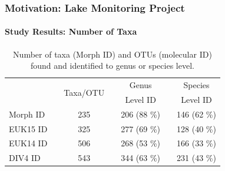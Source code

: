 \documentclass[xcolor=dvipsnames,envcountsect]{beamer}
\begin{document}
\begin{frame}\frametitle{Motivation: Lake Monitoring Project}
\framesubtitle{Study Results: Number of Taxa}

\begin{table}[htpb]\centering
\begin{tabular}{lcccccc}\toprule
&& \multirow{2}{*}{Taxa/OTU} && Genus && Species\\
&& && Level ID && Level ID \\\toprule
Morph ID && 235 && 206 (88 \%)&& 146 (62 \%) \\
EUK15 ID && 325 && 277 (69 \%) && 128 (40 \%) \\
EUK14 ID && 506 && 268 (53 \%) && 166 (33 \%) \\
DIV4 ID && 543 && 344 (63 \%) && 231 (43 \%) \\\bottomrule
\end{tabular}
\caption{Number of taxa (Morph ID) and OTUs (molecular ID) found and identified to genus or species level. } \label{Tab:Tab_2} 
\end{table}
\end{frame}
\end{document}
